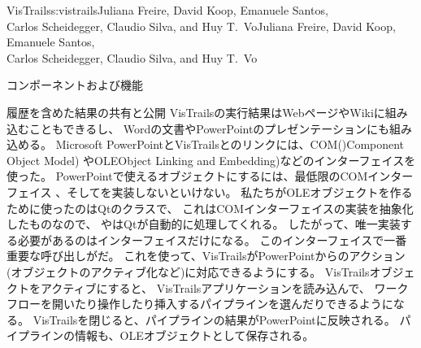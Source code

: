 \begin{aosachaptertoc}{VisTrails}{s:vistrails}{Juliana Freire, David Koop, Emanuele Santos, \\ Carlos Scheidegger, Claudio Silva, and Huy T.\ Vo}{Juliana Freire, David Koop, Emanuele Santos, \\ \hspace*{0.9cm} Carlos Scheidegger, Claudio Silva, and Huy T.\ Vo}
\begin{aosasect1}{コンポーネントおよび機能}
\begin{aosasect2}{履歴を含めた結果の共有と公開}
VisTrailsの実行結果はWebページやWikiに組み込むこともできるし、
Wordの文書やPowerPointのプレゼンテーションにも組み込める。
Microsoft PowerPointとVisTrailsとのリンクには、COM()Component Object Model)
やOLEObject Linking and Embedding)などのインターフェイスを使った。
PowerPointで使えるオブジェクトにするには、最低限のCOMインターフェイス
、そしてを実装しないといけない。
私たちがOLEオブジェクトを作るために使ったのはQtのクラスで、
これはCOMインターフェイスの実装を抽象化したものなので、
やはQtが自動的に処理してくれる。
したがって、唯一実装する必要があるのはインターフェイスだけになる。
このインターフェイスで一番重要な呼び出しがだ。
これを使って、VisTrailsがPowerPointからのアクション
(オブジェクトのアクティブ化など)に対応できるようにする。
VisTrailsオブジェクトをアクティブにすると、
VisTrailsアプリケーションを読み込んで、
ワークフローを開いたり操作したり挿入するパイプラインを選んだりできるようになる。
VisTrailsを閉じると、パイプラインの結果がPowerPointに反映される。
パイプラインの情報も、OLEオブジェクトとして保存される。


\end{aosasect2}
\end{aosasect1}
\end{aosachaptertoc}
